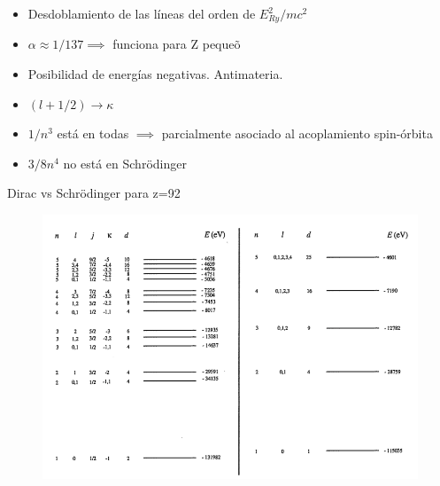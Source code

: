 \documentclass{beamer}
\begin{document}
\begin{frame}

\begin{itemize}%

 \item Desdoblamiento de las l\'ineas del orden de $E^2_{Ry}/mc^2$
 \vspace{5mm}
 \item $\alpha\approx 1/137 \implies $ funciona para Z peque\~o
 \vspace{5mm}
 \item Posibilidad de energ\'ias negativas. Antimateria.
 \vspace{5mm}
 \item $(l+1/2) \rightarrow \kappa $
  \vspace{5mm}
 \item $1/n^3$ est\'a en todas $\implies$ parcialmente asociado al acoplamiento spin-\'orbita
  \vspace{5mm}
 \item $3/8n^4$ no est\'a en Schr\"odinger
 
\end{itemize}
\end{frame}

\begin{frame}{Dirac vs Schr\"odinger para z=92}
\begin{figure}
\includegraphics[width=\textwidth,height=\textheight,keepaspectratio]{Figures/relativistic.png}
\end{figure}
\end{frame}
\end{document}
